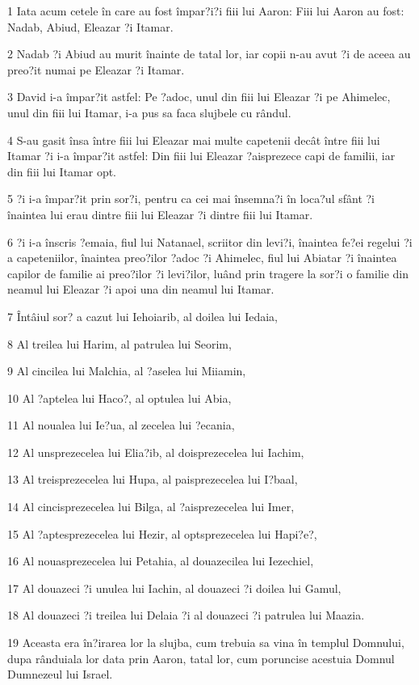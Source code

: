\par 1 Iata acum cetele în care au fost împar?i?i fiii lui Aaron: Fiii lui Aaron au fost: Nadab, Abiud, Eleazar ?i Itamar.
\par 2 Nadab ?i Abiud au murit înainte de tatal lor, iar copii n-au avut ?i de aceea au preo?it numai pe Eleazar ?i Itamar.
\par 3 David i-a împar?it astfel: Pe ?adoc, unul din fiii lui Eleazar ?i pe Ahimelec, unul din fiii lui Itamar, i-a pus sa faca slujbele cu rândul.
\par 4 S-au gasit însa între fiii lui Eleazar mai multe capetenii decât între fiii lui Itamar ?i i-a împar?it astfel: Din fiii lui Eleazar ?aisprezece capi de familii, iar din fiii lui Itamar opt.
\par 5 ?i i-a împar?it prin sor?i, pentru ca cei mai însemna?i în loca?ul sfânt ?i înaintea lui erau dintre fiii lui Eleazar ?i dintre fiii lui Itamar.
\par 6 ?i i-a înscris ?emaia, fiul lui Natanael, scriitor din levi?i, înaintea fe?ei regelui ?i a capeteniilor, înaintea preo?ilor ?adoc ?i Ahimelec, fiul lui Abiatar ?i înaintea capilor de familie ai preo?ilor ?i levi?ilor, luând prin tragere la sor?i o familie din neamul lui Eleazar ?i apoi una din neamul lui Itamar.
\par 7 Întâiul sor? a cazut lui Iehoiarib, al doilea lui Iedaia,
\par 8 Al treilea lui Harim, al patrulea lui Seorim,
\par 9 Al cincilea lui Malchia, al ?aselea lui Miiamin,
\par 10 Al ?aptelea lui Haco?, al optulea lui Abia,
\par 11 Al noualea lui Ie?ua, al zecelea lui ?ecania,
\par 12 Al unsprezecelea lui Elia?ib, al doisprezecelea lui Iachim,
\par 13 Al treisprezecelea lui Hupa, al paisprezecelea lui I?baal,
\par 14 Al cincisprezecelea lui Bilga, al ?aisprezecelea lui Imer,
\par 15 Al ?aptesprezecelea lui Hezir, al optsprezecelea lui Hapi?e?,
\par 16 Al nouasprezecelea lui Petahia, al douazecilea lui Iezechiel,
\par 17 Al douazeci ?i unulea lui Iachin, al douazeci ?i doilea lui Gamul,
\par 18 Al douazeci ?i treilea lui Delaia ?i al douazeci ?i patrulea lui Maazia.
\par 19 Aceasta era în?irarea lor la slujba, cum trebuia sa vina în templul Domnului, dupa rânduiala lor data prin Aaron, tatal lor, cum poruncise acestuia Domnul Dumnezeul lui Israel.
